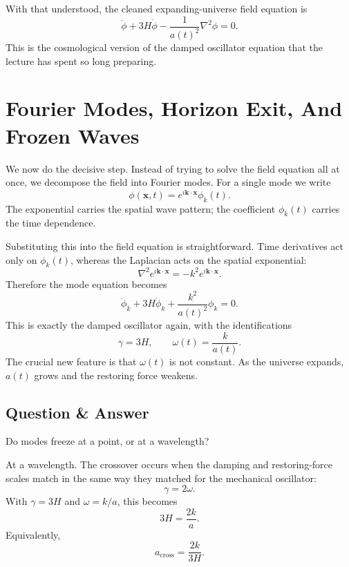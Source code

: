 With that understood, the cleaned expanding-universe field equation is
\begin{equation}
\ddot\phi+3H\dot\phi-\frac{1}{a(t)^{2}}\nabla^{2}\phi=0.
\end{equation}
This is the cosmological version of the damped oscillator equation that the lecture has spent so long preparing.

\section{Fourier Modes, Horizon Exit, And Frozen Waves}

We now do the decisive step. Instead of trying to solve the field equation all at once, we decompose the field into Fourier modes. For a single mode we write
\begin{equation}
\phi(\mathbf{x},t)=e^{i\mathbf{k}\cdot\mathbf{x}}\phi_{k}(t).
\end{equation}
The exponential carries the spatial wave pattern; the coefficient \(\phi_{k}(t)\) carries the time dependence.

Substituting this into the field equation is straightforward. Time derivatives act only on \(\phi_{k}(t)\), whereas the Laplacian acts on the spatial exponential:
\begin{equation}
\nabla^{2}e^{i\mathbf{k}\cdot\mathbf{x}}=-k^{2}e^{i\mathbf{k}\cdot\mathbf{x}}.
\end{equation}
Therefore the mode equation becomes
\begin{equation}
\ddot\phi_{k}+3H\dot\phi_{k}+\frac{k^{2}}{a(t)^{2}}\phi_{k}=0.
\end{equation}
This is exactly the damped oscillator again, with the identifications
\begin{equation}
\gamma=3H, \qquad \omega(t)=\frac{k}{a(t)}.
\end{equation}
The crucial new feature is that \(\omega(t)\) is not constant. As the universe expands, \(a(t)\) grows and the restoring force weakens.

\subsection{Question \& Answer}

Do modes freeze at a point, or at a wavelength?

At a wavelength. The crossover occurs when the damping and restoring-force scales match in the same way they matched for the mechanical oscillator:
\begin{equation}
\gamma=2\omega.
\end{equation}
With \(\gamma=3H\) and \(\omega=k/a\), this becomes
\begin{equation}
3H=\frac{2k}{a}.
\end{equation}
Equivalently,
\begin{equation}
a_{\mathrm{cross}}=\frac{2k}{3H}.
\end{equation}

